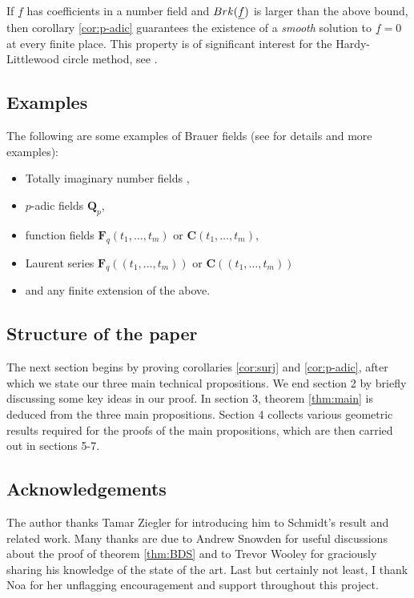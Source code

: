 \documentclass[10pt,a4paper]{amsart}
\let\ul\underline
\theoremstyle{definition}
\newcommand{\F}{\mathbf{F}}
\newcommand{\Q}{\mathbf{Q}}
\newcommand{\C}{\mathbf{C}}
\newcommand{\brk}{\textnormal{Brk}}
\begin{document}
If $\ul{f}$ has coefficients in a number field and $\brk(\ul{f})$ is larger than the above bound, then corollary \ref{cor:p-adic} guarantees the existence of a \emph{smooth} solution to $\ul{f} = 0$ at every finite place. This property is of significant interest for the Hardy-Littlewood circle method, see \cite{Birch,Skinner-HLS}.


\subsection{Examples}\label{Brauer-examples}
    The following are some examples of Brauer fields (see \cite{BDS} for details and more examples):
\begin{itemize}
    \item Totally imaginary number fields \cite{Peck},
    \item $p$-adic fields $\Q_p$,
    \item function fields $\F_q(t_1,\ldots,t_m)$ or $\C(t_1,\dots,t_m)$,
    \item Laurent series $\F_q(\!(t_1,\ldots,t_m)\!)$ or $\C(\!(t_1,\ldots,t_m)\!)$
    \item and any finite extension of the above.
\end{itemize}



\subsection{Structure of the paper}
The next section begins by proving corollaries \ref{cor:surj} and \ref{cor:p-adic}, after which we state our three main technical propositions. We end section 2 by briefly discussing some key ideas in our proof. In section 3, theorem \ref{thm:main} is deduced from the three main propositions. Section 4 collects various geometric results required for the proofs of the main propositions, which are then carried out in sections 5-7.  

\subsection{Acknowledgements} The author thanks Tamar Ziegler for introducing him to Schmidt's result \cite{Schmidt} and related work. Many thanks are due to Andrew Snowden for useful discussions about the proof of theorem \ref{thm:BDS} and to Trevor Wooley for graciously sharing his knowledge of the state of the art. Last but certainly not least, I thank Noa for her unflagging encouragement and support throughout this project.
\end{document}
